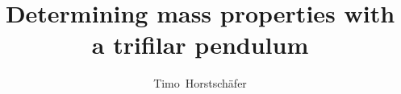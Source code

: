 \documentclass[journal]{IEEEtran}
\begin{document}

%
\title{Determining mass properties with a trifilar pendulum}
%
%
%

\author{Timo~Horstschäfer}

% 
%



% 




\end{document}
